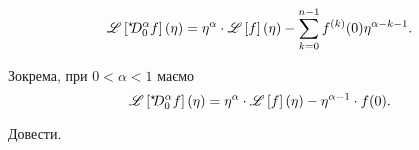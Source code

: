 \begin{lemma}
    \begin{equation}
        \mathscr{L}\left[{}^{\star\!\!}D_0^{\alpha} f\right](\eta) = \eta^{\alpha} \cdot \mathscr{L}\left[f\right](\eta) - \sum_{k = 0}^{n - 1} f^{(k)}(0) \eta^{\alpha - k - 1}.
    \end{equation}
\end{lemma}
\begin{example}
    Зокрема, при $0 < \alpha < 1$ маємо
    \begin{equation}
        \mathscr{L}\left[{}^{\star\!\!}D_0^{\alpha} f\right](\eta) = \eta^{\alpha} \cdot \mathscr{L}\left[f\right](\eta) - \eta^{\alpha - 1} \cdot f(0).
    \end{equation}
\end{example}
\begin{exercise}
    Довести.
\end{exercise}
